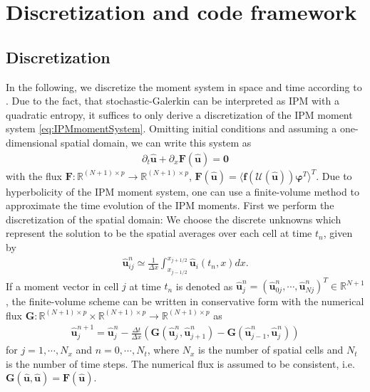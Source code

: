 \section{Discretization and code framework}
\label{sec:framework}
\subsection{Discretization}
In the following, we discretize the moment system in space and time according to \cite{kusch2017maximum}. Due to the fact, that stochastic-Galerkin can be interpreted as IPM with a quadratic entropy, it suffices to only derive a discretization of the IPM moment system \eqref{eq:IPMmomentSystem}.  
Omitting initial conditions and assuming a one-dimensional spatial domain, we can write this system  as
\begin{align*}
\partial_t \bm{\hat u}+\partial_x \bm{F}(\bm{\hat u}) = \bm{0}
\end{align*}
with the flux $\bm{F}:\mathbb{R}^{(N+1)\times p}\to\mathbb{R}^{(N+1)\times p}$, $\bm{F}(\bm{\hat u})=\langle \bm f(\mathcal{U}(\bm{\hat u}))\bm{\varphi}^T \rangle^T$. Due to hyperbolicity of the IPM moment system, one can use a finite-volume method to approximate the time evolution of the IPM moments. First we perform the discretization of the spatial domain: We choose the discrete unknowns which represent the solution to be the spatial averages over each cell at time $t_n$, given by
\begin{align*}
\bm{\hat u}_{ij}^n \simeq \frac{1}{\Delta x}\int_{x_{j-1/ 2}}^{x_{j+1/ 2}}\bm{\hat u}_i(t_n,x) dx.
\end{align*}
If a moment vector in cell $j$ at time $t_n$ is denoted as $\bm{\hat u}_j^n = (\bm{\hat u}_{0j}^n,\cdots,\bm{\hat u}_{Nj}^n)^T\in\mathbb{R}^{N+1}$, the finite-volume scheme can be written in conservative form with the numerical flux $\bm{G}:\mathbb{R}^{(N+1)\times p}\times\mathbb{R}^{(N+1)\times p}\to\mathbb{R}^{(N+1)\times p}$ as
\begin{align}\label{eq:IPMDiscretization}
\bm{\hat u}_{j}^{n+1} = \bm{\hat u}_{j}^{n}  - \frac{\Delta t}{\Delta x}\left( \bm{G}(\bm{\hat u}_{j}^{n},\bm{\hat u}_{j+1}^{n})- \bm{G}(\bm{\hat u}_{j-1}^{n},\bm{\hat u}_{j}^{n})\right)
\end{align}
for $j = 1,\cdots,N_x$ and $n = 0,\cdots,N_t$, where $N_x$ is the number of spatial cells and $N_t$ is the number of time steps.
The numerical flux is assumed to be consistent, i.e. $\bm{G}(\hat{\bm{u}},\hat{\bm{u}})=\bm{F}(\hat{\bm{u}})$.


